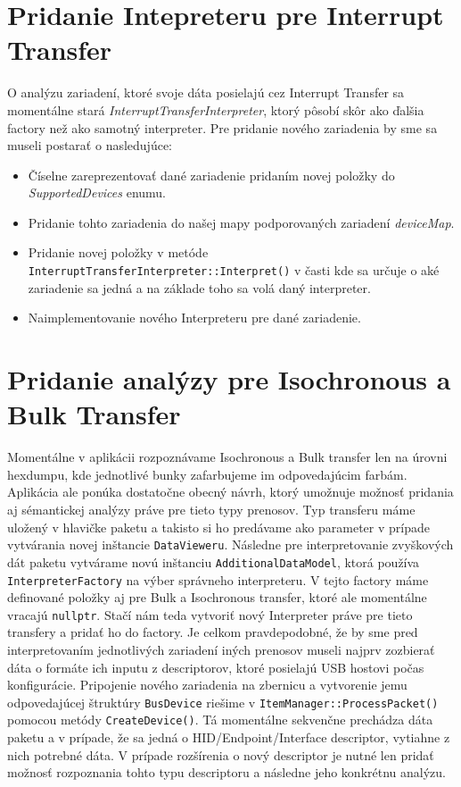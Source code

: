 \section{Pridanie Intepreteru pre Interrupt Transfer}
\label{sec:kap5:prid_interrupt}
O analýzu zariadení, ktoré svoje dáta posielajú cez Interrupt Transfer sa momentálne stará \textit{InterruptTransferInterpreter}, ktorý pôsobí skôr ako ďalšia factory než ako samotný interpreter. Pre pridanie nového zariadenia by sme sa museli postarať o nasledujúce:
\begin{itemize}
\item Číselne zareprezentovať dané zariadenie pridaním novej položky do \textit{SupportedDevices} enumu.
\item Pridanie tohto zariadenia do našej mapy podporovaných zariadení \textit{deviceMap}.
\item Pridanie novej položky v metóde \newline\texttt{InterruptTransferInterpreter::Interpret()} v časti kde sa určuje o aké zariadenie sa jedná a na základe toho sa volá daný interpreter.
\item Naimplementovanie nového Interpreteru pre dané zariadenie.
\end{itemize}
\section{Pridanie analýzy pre Isochronous a Bulk \newline Transfer}
\label{sec:kap5:prid_an_iso_bulk}
Momentálne v aplikácii rozpoznávame Isochronous a Bulk transfer len na úrovni hexdumpu, kde jednotlivé bunky zafarbujeme im odpovedajúcim farbám. Aplikácia ale ponúka dostatočne obecný návrh, ktorý umožnuje možnosť pridania aj sémantickej analýzy práve pre tieto typy prenosov. Typ transferu máme uložený v hlavičke paketu a takisto si ho predávame ako parameter v prípade vytvárania novej inštancie \texttt{DataVieweru}. Následne pre interpretovanie zvyškových dát paketu vytvárame novú inštanciu \texttt{AdditionalDataModel}, ktorá používa \texttt{InterpreterFactory} na výber správneho interpreteru. V tejto factory máme definované položky aj pre Bulk a Isochronous transfer, ktoré ale momentálne vracajú \texttt{nullptr}. Stačí nám teda vytvoriť nový Interpreter práve pre tieto transfery a pridať ho do factory. Je celkom pravdepodobné, že by sme pred interpretovaním jednotlivých zariadení iných prenosov museli najprv zozbierať dáta o formáte ich inputu z descriptorov, ktoré posielajú USB hostovi počas konfigurácie. Pripojenie nového zariadenia na zbernicu a vytvorenie jemu odpovedajúcej štruktúry \texttt{BusDevice} riešime v \texttt{ItemManager::ProcessPacket()} pomocou metódy \texttt{CreateDevice()}. Tá momentálne sekvenčne prechádza dáta paketu a v prípade, že sa jedná o HID/Endpoint/Interface descriptor, vytiahne z nich potrebné dáta. V prípade rozšírenia o nový descriptor je nutné len pridať možnosť rozpoznania tohto typu descriptoru a následne jeho konkrétnu analýzu.
